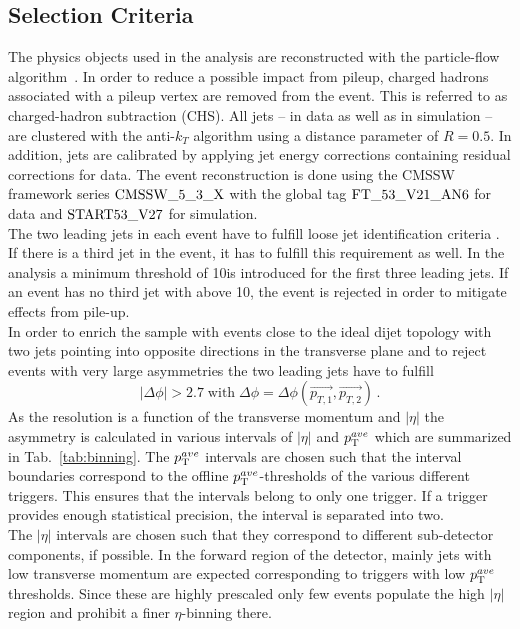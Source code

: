 \subsection{Selection Criteria}
\label{subsec:jer_sel_cuts}
The physics objects used in the analysis are reconstructed with the particle-flow algorithm~\cite{CMS-PAS-PFT-09-001}. In order to reduce a possible impact from pileup, charged hadrons associated with a pileup vertex are removed from the event. This is referred to as charged-hadron subtraction (CHS). All jets -- in data as well as in simulation -- are clustered with the anti-$k_T$ algorithm using a distance parameter of $R=0.5$. In addition, jets are calibrated by applying jet energy corrections containing residual corrections for data. The event reconstruction is done using the CMSSW framework series $\rm{CMSSW\_5\_3\_X}$ with the global tag $\rm{FT\_53\_V21\_AN6}$ for data and $\rm{START53\_V27}$ for simulation. \\
The two leading jets in each event have to fulfill loose jet identification criteria . If there is a third jet in the event, it has to fulfill this requirement as well. In the analysis a minimum \pt threshold of 10\gev is introduced for the first three leading jets. If an event has no third jet with \pt above 10\gev, the event is rejected in order to mitigate effects from pile-up. \\
In order to enrich the sample with events close to the ideal dijet topology with two jets pointing into opposite directions in the transverse plane and to reject events with very large asymmetries the two leading jets have to fulfill 
\begin{equation}
|\Delta \phi| > 2.7 \; \mathrm{with} \; \Delta \phi = \Delta \phi(\vec{p_{T,1}}, \vec{p_{T,2}}) \, .
\end{equation}
As the resolution is a function of the transverse momentum and $|\eta|$ the asymmetry is calculated in various intervals of $|\eta|$ and $p_{\text{T}}^{ave}$ which are summarized in Tab.~\ref{tab:binning}. The $p_{\text{T}}^{ave}$ intervals are chosen such that the interval boundaries correspond to the offline $p_{\text{T}}^{ave}$-thresholds of the various different triggers. This ensures that the intervals belong to only one trigger. If a trigger provides enough statistical precision, the interval is separated into two. \\
The $|\eta|$ intervals are chosen such that they correspond to different sub-detector components, if possible. In the forward region of the detector, mainly jets with low transverse momentum are expected corresponding to triggers with low $p_{\text{T}}^{ave}$ thresholds. Since these are highly prescaled only few events populate the high $|\eta|$ region and prohibit a finer $\eta$-binning there. \\
